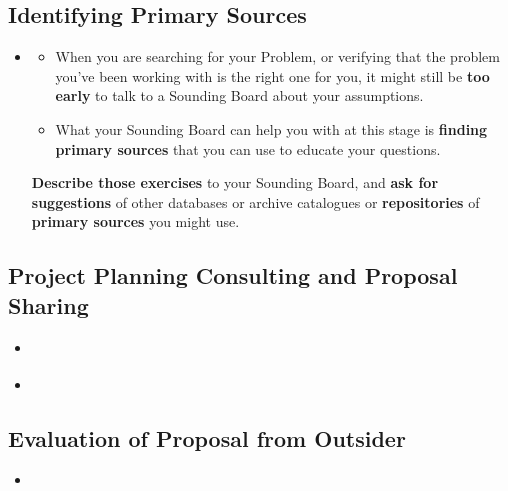 \documentclass[11pt]{article}
\begin{document}
\subsection{Identifying Primary Sources}
\begin{itemize}
\item  \begin{exercise}
\begin{itemize}
\item When you are searching for your Problem, or verifying that the problem you’ve been working with is the right one for you, it might still be \textbf{too early} to talk to a Sounding Board about your assumptions. 

\item What your Sounding Board can help you with at this stage is \textbf{finding primary sources} that you can use to educate your questions. 
\end{itemize}

\textbf{Describe those exercises} to your Sounding Board, and \textbf{ask for suggestions} of other databases or archive catalogues or \textbf{repositories} of \textbf{primary sources} you might use.
\end{exercise}
\end{itemize}
\subsection{Project Planning Consulting and Proposal Sharing}
\begin{itemize}
\item \begin{exercise}
\end{exercise}

\vspace{20pt}
\item \begin{exercise}
\end{exercise}
\end{itemize}
\subsection{Evaluation of Proposal from Outsider}
\begin{itemize}
\item \begin{exercise}
\end{exercise}
\end{itemize}
\end{document}
